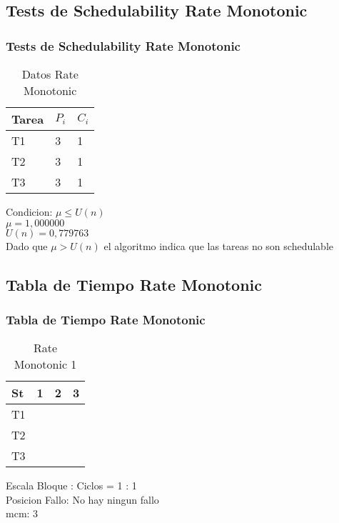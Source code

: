 \documentclass[xcolor=table]{beamer}
\begin{document}
\subsection{Tests de Schedulability  Rate Monotonic } 

\begin{frame} 
\frametitle{Tests de Schedulability  Rate Monotonic } 
\begin{table} 
\centering 
\begin{tabular}{|l|l|l|} 
\hline 
\cellcolor{lightgray}Tarea & \cellcolor{lightgray}$P_i$ & \cellcolor{lightgray}$C_i$ \\ \hline 
T1   & 3  &  1\\ \hline 
T2   & 3  &  1\\ \hline 
T3   & 3  &  1\\ \hline 
\end{tabular} 
\caption{Datos  Rate Monotonic } 
\end{table} 
Condicion: $\mu \leq U(n)$ \\ 
$\mu =  1,000000 $ \\ 
$U(n) =  0,779763 $ \\ 
Dado que $\mu>U(n)$ el algoritmo indica que las tareas no son schedulable \\ 
\end{frame} 

\subsection{Tabla de Tiempo  Rate Monotonic } 

\begin{frame} 
\frametitle{Tabla de Tiempo  Rate Monotonic } 
\begin{table} 
\centering 
\begin{tabular}{|l|l|l|l|} 
\hline 
St &  1 \cellcolor{green} &  2 \cellcolor{green} &  3 \cellcolor{green} \\ \hline 
T1 & \cellcolor{blue} & & \\ \hline 
T2 & & \cellcolor{purple} & \\ \hline 
T3 & & & \cellcolor{cyan} \\ \hline 
\end{tabular} 
\caption{ Rate Monotonic 1 } 
\end{table} 
Escala Bloque : Ciclos = 1 : 1 \\ 
Posicion Fallo: No hay ningun fallo \\ 
mcm:  3 \\ 
\end{frame} 
\end{document}
